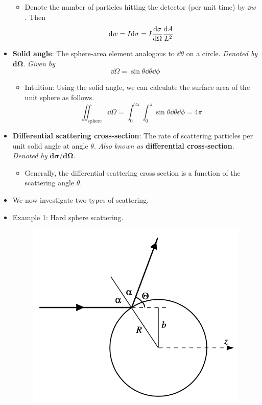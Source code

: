 \documentclass[../notes.tex]{subfiles}
\begin{document}
\begin{itemize}
\begin{itemize}
\begin{itemize}
        \end{itemize}
        \item Denote the number of particles hitting the detector (per unit time) by $\dd{w}$. Then
        \begin{equation*}
            \dd{w} = I\dd\sigma = I\dv{\sigma}{\Omega}\frac{\dd{A}}{L^2}
        \end{equation*}
    \end{itemize}
    \item \textbf{Solid angle}: The sphere-area element analogous to $\dd\theta$ on a circle. \emph{Denoted by} $\bm{\textbf{d}\Omega}$. \emph{Given by}
    \begin{equation*}
        \dd\Omega = \sin\theta\dd\theta\dd\phi
    \end{equation*}
    \begin{itemize}
        \item Intuition: Using the solid angle, we can calculate the surface area of the unit sphere as follows.
        \begin{equation*}
            \iint_\text{sphere}\dd\Omega = \int_0^{2\pi}\int_0^\pi\sin\theta\dd\theta\dd\phi = 4\pi
        \end{equation*}
    \end{itemize}
    \item \textbf{Differential scattering cross-section}: The rate of scattering particles per unit solid angle at angle $\theta$. \emph{Also known as} \textbf{differential cross-section}. \emph{Denoted by} $\bm{\textbf{d}\sigma/\textbf{d}\Omega}$.
    \begin{itemize}
        \item Generally, the differential scattering cross section is a function of the scattering angle $\theta$.
    \end{itemize}
    \item We now investigate two types of scattering.
    \item Example 1: Hard sphere scattering.
    \begin{figure}[h!]
        \centering
        \includegraphics[width=0.35\linewidth]{../ExtFiles/scatteringHS.png}

\end{figure}
\end{itemize}
\end{document}
